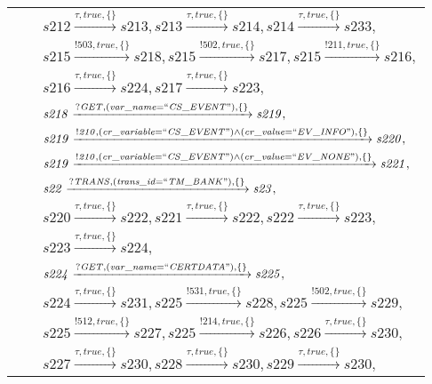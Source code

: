 \begin{tabular}{lcl}
& & $\mathit{s212}\xrightarrow{\mathit{\tau}, \mathit{true}, \{\}}\mathit{s213},\mathit{s213}\xrightarrow{\mathit{\tau}, \mathit{true}, \{\}}\mathit{s214},\mathit{s214}\xrightarrow{\mathit{\tau}, \mathit{true}, \{\}}\mathit{s233},$ \\
& & $\mathit{s215}\xrightarrow{\mathit{!503}, \mathit{true}, \{\}}\mathit{s218},\mathit{s215}\xrightarrow{\mathit{!502}, \mathit{true}, \{\}}\mathit{s217},\mathit{s215}\xrightarrow{\mathit{!211}, \mathit{true}, \{\}}\mathit{s216},$ \\
& & $\mathit{s216}\xrightarrow{\mathit{\tau}, \mathit{true}, \{\}}\mathit{s224},\mathit{s217}\xrightarrow{\mathit{\tau}, \mathit{true}, \{\}}\mathit{s223},$ \\
& & $\mathit{s218}\xrightarrow{\mathit{?GET}, \mathit{(var\_name = ``CS\_EVENT")}, \{\}}\mathit{s219},$ \\
& & $\mathit{s219}\xrightarrow{\mathit{!210}, \mathit{(cr\_variable = ``CS\_EVENT") \land (cr\_value = ``EV\_INFO")}, \{\}}\mathit{s220},$ \\
& & $\mathit{s219}\xrightarrow{\mathit{!210}, \mathit{(cr\_variable = ``CS\_EVENT") \land (cr\_value = ``EV\_NONE")}, \{\}}\mathit{s221},$ \\
& & $\mathit{s22}\xrightarrow{\mathit{?TRANS}, \mathit{(trans\_id = ``TM\_BANK")}, \{\}}\mathit{s23},$ \\
& & $\mathit{s220}\xrightarrow{\mathit{\tau}, \mathit{true}, \{\}}\mathit{s222},\mathit{s221}\xrightarrow{\mathit{\tau}, \mathit{true}, \{\}}\mathit{s222},\mathit{s222}\xrightarrow{\mathit{\tau}, \mathit{true}, \{\}}\mathit{s223},$ \\
& & $\mathit{s223}\xrightarrow{\mathit{\tau}, \mathit{true}, \{\}}\mathit{s224},$ \\
& & $\mathit{s224}\xrightarrow{\mathit{?GET}, \mathit{(var\_name = ``CERTDATA")}, \{\}}\mathit{s225},$ \\
& & $\mathit{s224}\xrightarrow{\mathit{\tau}, \mathit{true}, \{\}}\mathit{s231},\mathit{s225}\xrightarrow{\mathit{!531}, \mathit{true}, \{\}}\mathit{s228},\mathit{s225}\xrightarrow{\mathit{!502}, \mathit{true}, \{\}}\mathit{s229},$ \\
& & $\mathit{s225}\xrightarrow{\mathit{!512}, \mathit{true}, \{\}}\mathit{s227},\mathit{s225}\xrightarrow{\mathit{!214}, \mathit{true}, \{\}}\mathit{s226},\mathit{s226}\xrightarrow{\mathit{\tau}, \mathit{true}, \{\}}\mathit{s230},$ \\
& & $\mathit{s227}\xrightarrow{\mathit{\tau}, \mathit{true}, \{\}}\mathit{s230},\mathit{s228}\xrightarrow{\mathit{\tau}, \mathit{true}, \{\}}\mathit{s230},\mathit{s229}\xrightarrow{\mathit{\tau}, \mathit{true}, \{\}}\mathit{s230},$ \\

\end{tabular}
